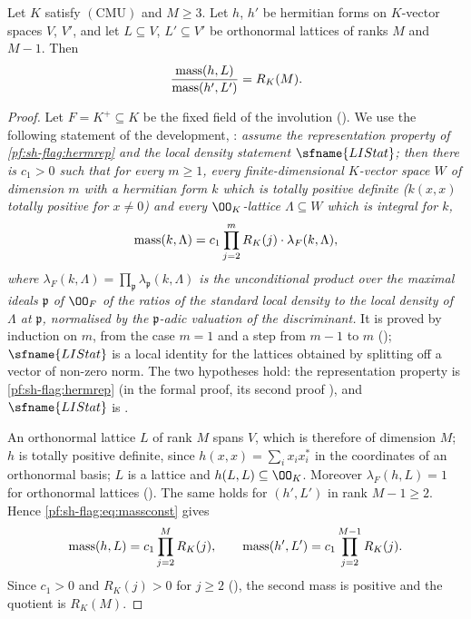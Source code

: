 \begin{proposition}\label{pf:sh-flag:massratio}
Let $K$ satisfy $(\mathrm{CMU})$ and $M\ge3$. Let $h$, $h'$ be hermitian forms on $K$-vector spaces $V$, $V'$, and
let $L\subseteq V$, $L'\subseteq V'$ be orthonormal lattices of ranks $M$ and $M-1$. Then
\[
\frac{\operatorname{mass}(h,L)}{\operatorname{mass}(h',L')}=R_K(M).
\]
\end{proposition}

\begin{proof}
Let $F=K^+\subseteq K$ be the fixed field of the involution
(). We use the following statement of the
development, : \emph{assume the representation
property of \cref{pf:sh-flag:hermrep} and the local density statement $\sfname{LIStat}$; then there is
$c_1>0$ such that for every $m\ge1$, every finite-dimensional $K$-vector space $W$ of dimension $m$ with a
hermitian form $k$ which is totally positive definite ($k(x,x)$ totally positive for $x\ne0$) and every
$\OO_K$-lattice $\Lambda\subseteq W$ which is integral for $k$,}
\begin{equation}\label{pf:sh-flag:eq:massconst}
\operatorname{mass}(k,\Lambda)=c_1\prod_{j=2}^mR_K(j)\cdot\lambda_F(k,\Lambda),
\end{equation}
\emph{where $\lambda_F(k,\Lambda)=\prod_{\mathfrak p}\lambda_{\mathfrak p}(k,\Lambda)$ is the unconditional
product over the maximal ideals $\mathfrak p$ of $\OO_F$ of the ratios of the standard local density to the local
density of $\Lambda$ at $\mathfrak p$, normalised by the $\mathfrak p$-adic valuation of the discriminant.} It is
proved by induction on $m$, from the case $m=1$ and a step from $m-1$ to $m$
(); $\sfname{LIStat}$ is a local identity for the
lattices obtained by splitting off a vector of non-zero norm. The two hypotheses hold: the representation property is
\cref{pf:sh-flag:hermrep} (in the formal proof, its second proof
), and $\sfname{LIStat}$ is
.

An orthonormal lattice $L$ of rank $M$ spans $V$, which is therefore of dimension $M$; $h$ is totally positive
definite, since $h(x,x)=\sum_ix_ix_i^*$ in the coordinates of an orthonormal basis; $L$ is a lattice and
$h(L,L)\subseteq\OO_K$. Moreover $\lambda_F(h,L)=1$ for orthonormal lattices
(). The same holds for $(h',L')$ in rank
$M-1\ge2$. Hence \eqref{pf:sh-flag:eq:massconst} gives
\[
\operatorname{mass}(h,L)=c_1\prod_{j=2}^{M}R_K(j),\qquad \operatorname{mass}(h',L')=c_1\prod_{j=2}^{M-1}R_K(j).
\]
Since $c_1>0$ and $R_K(j)>0$ for $j\ge2$ (), the
second mass is positive and the quotient is $R_K(M)$.
\end{proof}

